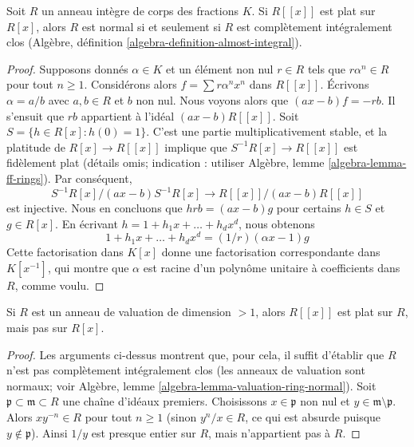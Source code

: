 \begin{lemma}
\label{lemma-almost-integral-when-powerseries-flat}
Soit $R$ un anneau intègre de corps des fractions $K$.
Si $R[[x]]$ est plat sur $R[x]$, alors $R$ est normal si et seulement
si $R$ est complètement intégralement clos
(Algèbre, définition \ref{algebra-definition-almost-integral}).
\end{lemma}

\begin{proof}
Supposons donnés $\alpha \in K$ et un élément non nul $r \in R$ tels que
$r \alpha^n \in R$ pour tout $n \geq 1$. Considérons alors
$f = \sum r \alpha^n x^n$ dans $R[[x]]$. Écrivons $\alpha = a/b$
avec $a, b \in R$ et $b$ non nul. Nous voyons alors que $(a x - b)f = -rb$.
Il s'ensuit que $rb$ appartient à l'idéal $(ax - b)R[[x]]$.
Soit $S = \{h \in R[x] : h(0) = 1\}$. C'est une partie multiplicativement stable,
et la platitude de $R[x] \to R[[x]]$ implique que $S^{-1}R[x] \to R[[x]]$
est fidèlement plat (détails omis; indication : utiliser Algèbre, lemme
\ref{algebra-lemma-ff-rings}). Par conséquent,
$$
S^{-1}R[x]/(ax - b)S^{-1}R[x] \to R[[x]]/(ax - b)R[[x]]
$$
est injective. Nous en concluons que
$h rb = (ax - b) g$ pour certains $h \in S$ et $g \in R[x]$.
En écrivant $h = 1 + h_1 x + \ldots + h_d x^d$, nous obtenons
$$
1 + h_1 x + \ldots + h_d x^d = (1/r)(\alpha x - 1)g
$$
Cette factorisation dans $K[x]$ donne une factorisation correspondante
dans $K[x^{-1}]$, qui montre que $\alpha$ est racine d'un polynôme unitaire
à coefficients dans $R$, comme voulu.
\end{proof}

\begin{lemma}
\label{lemma-completion-polynomial-ring-not-flat-bis}
Si $R$ est un anneau de valuation de dimension $> 1$, alors $R[[x]]$
est plat sur $R$, mais pas sur $R[x]$.
\end{lemma}

\begin{proof}
Les arguments ci-dessus montrent que, pour cela, il suffit d'établir que
$R$ n'est pas complètement intégralement clos (les anneaux de valuation sont
normaux; voir Algèbre, lemme \ref{algebra-lemma-valuation-ring-normal}).
Soit $\mathfrak p \subset \mathfrak m \subset R$ une chaîne d'idéaux premiers.
Choisissons $x \in \mathfrak p$ non nul et $y \in \mathfrak m \setminus \mathfrak p$.
Alors $x y^{-n} \in R$ pour tout $n \geq 1$ (sinon $y^n/x \in R$,
ce qui est absurde puisque $y \not \in \mathfrak p$). Ainsi $1/y$ est
presque entier sur $R$, mais n'appartient pas à $R$.
\end{proof}

